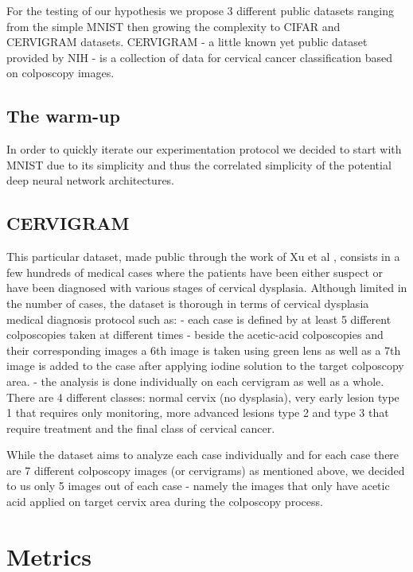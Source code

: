 \documentclass[11pt]{article}
\begin{document}
For the testing of our hypothesis we propose 3 different public datasets
ranging from the simple MNIST then growing the complexity to CIFAR and
CERVIGRAM datasets. CERVIGRAM \cite{xu2015new} - a little known yet
public dataset provided by NIH - is a collection of data for cervical
cancer classification based on colposcopy images.

    \hypertarget{the-warm-up}{%
\subsection{The warm-up}\label{the-warm-up}}

In order to quickly iterate our experimentation protocol we decided to
start with MNIST due to its simplicity and thus the correlated
simplicity of the potential deep neural network architectures.

    \hypertarget{cervigram}{%
\subsection{CERVIGRAM}\label{cervigram}}

This particular dataset, made public through the work of Xu et al
\cite{xu2015new}, consists in a few hundreds of medical cases where the
patients have been either suspect or have been diagnosed with various
stages of cervical dysplasia. Although limited in the number of cases,
the dataset is thorough in terms of cervical dysplasia medical diagnosis
protocol such as: - each case is defined by at least 5 different
colposcopies taken at different times - beside the acetic-acid
colposcopies and their corresponding images a 6th image is taken using
green lens as well as a 7th image is added to the case after applying
iodine solution to the target colposcopy area. - the analysis is done
individually on each cervigram as well as a whole. There are 4 different
classes: normal cervix (no dysplasia), very early lesion type 1 that
requires only monitoring, more advanced lesions type 2 and type 3 that
require treatment and the final class of cervical cancer.

While the dataset aims to analyze each case individually and for each
case there are 7 different colposcopy images (or cervigrams) as
mentioned above, we decided to us only 5 images out of each case -
namely the images that only have acetic acid applied on target cervix
area during the colposcopy process.

    \hypertarget{metrics}{%
\section{Metrics}\label{metrics}}
\end{document}
